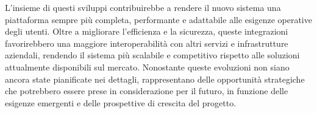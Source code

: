 L’insieme di questi sviluppi contribuirebbe a rendere il nuovo sistema una piattaforma sempre più completa, performante e adattabile alle esigenze operative degli utenti. Oltre a migliorare l’efficienza e la sicurezza, queste integrazioni favorirebbero una maggiore interoperabilità con altri servizi e infrastrutture aziendali, rendendo il sistema più scalabile e competitivo rispetto alle soluzioni attualmente disponibili sul mercato. Nonostante queste evoluzioni non siano ancora state pianificate nei dettagli, rappresentano delle opportunità strategiche che potrebbero essere prese in considerazione per il futuro, in funzione delle esigenze emergenti e delle prospettive di crescita del progetto.
